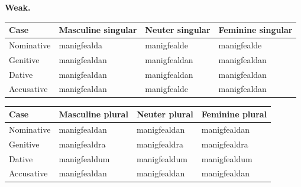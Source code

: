 \textbf{Weak.}

\par\begingroup
\fontsize{10.5}{13.2}\selectfont
\setlength{\LTleft}{0pt}\setlength{\LTright}{\fill}
\noindent
\begin{tabular}{@{}>{\raggedright\arraybackslash}p{22.0mm}>{\raggedright\arraybackslash}p{31.188mm}>{\raggedright\arraybackslash}p{31.188mm}>{\raggedright\arraybackslash}p{31.188mm}@{}}
\toprule
\textbf{Case} & \textbf{Masculine singular} & \textbf{Neuter singular} & \textbf{Feminine singular} \\
\midrule
Nominative & manigfealda & manigfealde & manigfealde \\
Genitive & manigfealdan & manigfealdan & manigfealdan \\
Dative & manigfealdan & manigfealdan & manigfealdan \\
Accusative & manigfealdan & manigfealde & manigfealdan \\
\bottomrule
\end{tabular}
\par\endgroup
\par\addvspace{5pt}
\par\begingroup
\fontsize{10.5}{13.2}\selectfont
\setlength{\LTleft}{0pt}\setlength{\LTright}{\fill}
\noindent
\begin{tabular}{@{}>{\raggedright\arraybackslash}p{22.0mm}>{\raggedright\arraybackslash}p{31.188mm}>{\raggedright\arraybackslash}p{31.188mm}>{\raggedright\arraybackslash}p{31.188mm}@{}}
\toprule
\textbf{Case} & \textbf{Masculine plural} & \textbf{Neuter plural} & \textbf{Feminine plural} \\
\midrule
Nominative & manigfealdan & manigfealdan & manigfealdan \\
Genitive & manigfealdra & manigfealdra & manigfealdra \\
Dative & manigfealdum & manigfealdum & manigfealdum \\
Accusative & manigfealdan & manigfealdan & manigfealdan \\
\bottomrule
\end{tabular}
\par\endgroup

